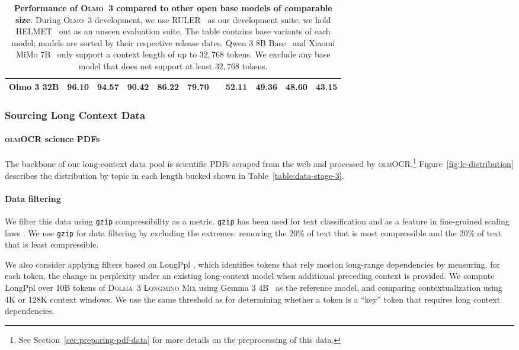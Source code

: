 \documentclass[table]{ai2style/ai2}
\newcommand{\newOlmo}{Olmo\xspace}
\newcommand{\olmothree}{\textsc{\newOlmo~3}\xspace}
\newcommand{\longminomix}{\textsc{Dolma~3 Longmino Mix}\xspace}
\newcommand{\olmocr}{\textsc{olmOCR}\xspace}
\newcommand{\olmocrPDF}{{\olmocr science PDFs}\xspace}
\begin{document}
\begin{table}[h]
\begin{tabular}{lcccccp{0.2em}cccc}
\rowcolor{ai2lightpink} Olmo 3 32B & 96.10 & 94.57 & 90.42 & 86.22 & 79.70 && 52.11 & 49.36 & 48.60 & 43.15 \\
\bottomrule
\end{tabular}
\caption{\textbf{Performance of \olmothree compared to other open base models of comparable size}. During \olmothree development, we use RULER~\citep{hsieh2024rulerwhatsrealcontext} as our development suite; we hold HELMET~\citep{yen2025helmet} out as an unseen evaluation suite.
The table contains base variants of each model; models are sorted by their respective release dates.
Qwen 3 8B Base~\citep{qwen3} and Xiaomi MiMo 7B~\citep{mimo} only support a context length of up to $32{,}768$ tokens.
We exclude any base model that does not support at least $32{,}768$ tokens.
}
\label{tab:ruler_baselines}
\end{table}

\subsubsection{Sourcing Long Context Data}
\label{lc:data}

\paragraph{\olmocrPDF} The backbone of our long-context data pool is scientific PDFs scraped from the web and processed by \olmocr.\footnote{See Section~\ref{sec:preparing-pdf-data} for more details on the preprocessing of this data.}
Figure~\ref{fig:lc-distribution} describes the distribution by topic in each length bucked shown in Table~\ref{table:data-stage-3}.

\paragraph{Data filtering}
We filter this data using \texttt{gzip} compressibility as a metric. \texttt{gzip} has been used for text classification \citep{jiang2022moreparameterfreetextclassification} and as a feature in fine-grained scaling laws \citep{pandey2024gzippredictsdatadependentscaling}. We use \texttt{gzip} for data filtering by excluding the extremes: removing the 20\% of text that is most compressible and the 20\% of text that is least compressible. 

We also consider applying filters based on LongPpl \citep{fang2025wrongperplexitylongcontextlanguage}, which identifies tokens that rely moston  long-range dependencies by measuring, for each token, the change in perplexity under an existing long-context model when additional preceding context is provided. We compute LongPpl over 10B tokens of \longminomix{} using Gemma 3 4B~\citep{team2025gemma3} as the reference model, and comparing contextualization using 4K or 128K context windows. We use the same threshold as \citet{fang2025wrongperplexitylongcontextlanguage} for determining whether a token is a ``key'' token that requires long context dependencies.
\end{document}
